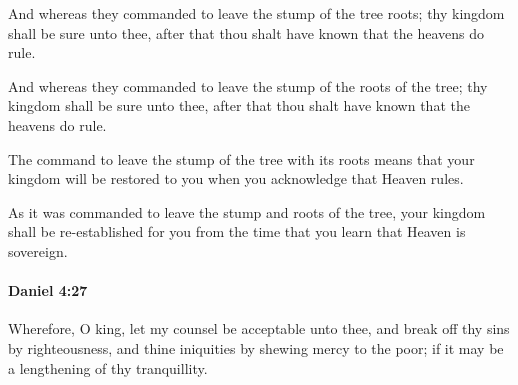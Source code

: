 			And whereas they commanded to leave the stump of the tree roots; thy kingdom shall be sure unto thee, after that thou shalt have known that the heavens do rule.

			\begin{versebox}
					\item[BHS] 
					\item[LXX] 
					\item[ASV] And whereas they commanded to leave the stump of the roots of the tree; thy kingdom shall be sure unto thee, after that thou shalt have known that the heavens do rule.
					\item[NIV] The command to leave the stump of the tree with its roots means that your kingdom will be restored to you when you acknowledge that Heaven rules.
					\item[NRSV] As it was commanded to leave the stump and roots of the tree, your kingdom shall be re-established for you from the time that you learn that Heaven is sovereign.
			\end{versebox}

		\paragraph{Daniel 4:27} %
			\label{DANIEL-4-27}

			Wherefore, O king, let my counsel be acceptable unto thee, and break off thy sins by righteousness, and thine iniquities by shewing mercy to the poor; if it may be a lengthening of thy tranquillity.

